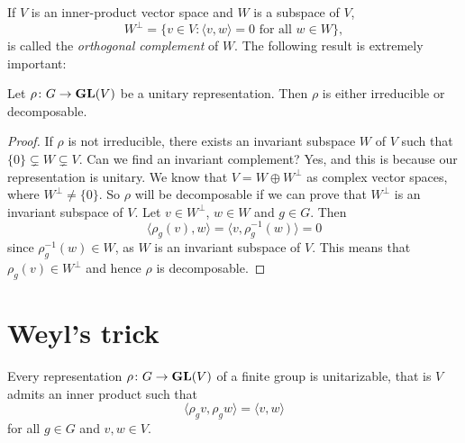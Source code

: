 If $V$ is an inner-product vector space and $W$ is a subspace of $V$, 
\[
W^\perp = \{v\in V:\langle v,w\rangle=0\text{ for all $w\in W$}\}, 
\]
is called the 
\emph{orthogonal complement} of $W$. The following result is extremely important: 

\begin{proposition}
\label{pro:irr_or_dec}
Let $\rho\colon G\to\mathbf{GL}(V)$ be a unitary representation. Then $\rho$ is either
irreducible or decomposable.
\end{proposition}

\begin{proof}
	If $\rho$ is not irreducible, there exists an invariant subspace $W$ of $V$ such that
	$\{0\}\subsetneq W\subsetneq V$. Can we find an invariant complement? Yes, and this is because 
        our representation is unitary.  
	We know that $V=W\oplus W^{\perp}$ as complex vector spaces, where 
	$W^\perp\ne\{0\}$. So $\rho$ will be decomposable if we can prove that
	$W^\perp$ is an invariant subspace of $V$. 
	Let $v\in W^\perp$, $w\in W$ and $g\in G$. Then  
	\[
	\langle \rho_g(v),w\rangle=\langle v,\rho_g^{-1}(w)\rangle=0   
	\]
	since $\rho_g^{-1}(w)\in W$, as $W$ is an invariant subspace of $V$. This means that 
	$\rho_g(v)\in W^\perp$ and hence $\rho$ is decomposable. 
\end{proof}

\section{Weyl's trick} 

\begin{theorem}[Weyl]
    Every representation $\rho\colon G\to\mathbf{GL}(V)$ 
    of a finite group is unitarizable, that is 
    $V$ admits an inner
    product such that
    \[
    \langle\rho_gv,\rho_gw\rangle=\langle v,w\rangle
    \]
    for all $g\in G$ and $v,w\in V$.
\end{theorem}

